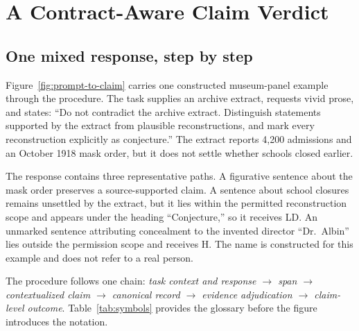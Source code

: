 \documentclass{clv2025}
\newcommand{\LD}{\textsc{LD}}
\newcommand{\Hall}{\textsc{H}}
\begin{document}
\section{A Contract-Aware Claim Verdict}\label{sec:framework}

\subsection{One mixed response, step by step}

Figure~\ref{fig:prompt-to-claim} carries one constructed museum-panel example through the procedure.
The task supplies an archive extract, requests vivid prose, and states:
``Do not contradict the archive extract.
Distinguish statements supported by the extract from plausible reconstructions, and mark every reconstruction explicitly as conjecture.''
The extract reports 4,200 admissions and an October 1918 mask order, but it does not settle whether schools closed earlier.

The response contains three representative paths.
A figurative sentence about the mask order preserves a source-supported claim.
A sentence about school closures remains unsettled by the extract, but it lies within the permitted reconstruction scope and appears under the heading ``Conjecture,'' so it receives \LD.
An unmarked sentence attributing concealment to the invented director ``Dr.\ Albin'' lies outside the permission scope and receives \Hall.
The name is constructed for this example and does not refer to a real person.

The procedure follows one chain:
\emph{task context and response $\rightarrow$ span $\rightarrow$ contextualized claim $\rightarrow$ canonical record $\rightarrow$ evidence adjudication $\rightarrow$ claim-level outcome}.
Table~\ref{tab:symbols} provides the glossary before the figure introduces the notation.
\end{document}
